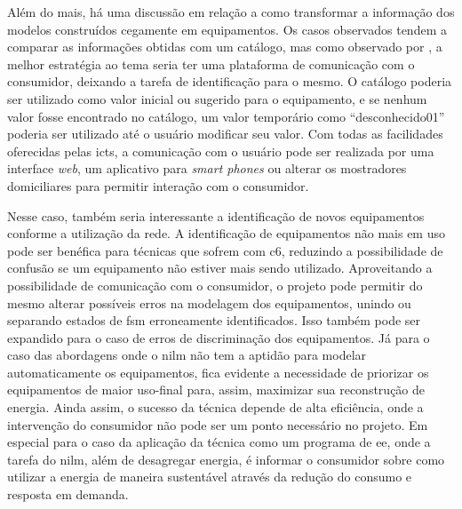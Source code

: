 Além do mais, há uma discussão em relação a como transformar a
informação dos modelos construídos cegamente em equipamentos. Os casos
observados \cite{nilm_hart_1992_8,nilm_bergman_distribuido_2011,
nilm_zeifman_vastext_approach_2012} tendem a comparar as informações
obtidas com um catálogo, mas como observado por
\cite{nilm_matthews_overview_2008_22}, a melhor estratégia ao tema
seria ter uma plataforma de comunicação com o consumidor, deixando a
tarefa de identificação para o mesmo. O catálogo poderia ser utilizado
como valor inicial ou sugerido para o equipamento, e se nenhum valor
fosse encontrado no catálogo, um valor temporário como
``desconhecido01'' poderia ser utilizado até o usuário modificar seu
valor. Com todas as facilidades oferecidas pelas \glspl{ict}, a
comunicação com o usuário pode ser realizada por uma interface
\emph{web}, um aplicativo para \emph{smart phones} ou alterar os
mostradores domiciliares para permitir interação com o consumidor.

Nesse caso, também seria interessante a identificação de novos
equipamentos conforme a utilização da rede. A identificação de equipamentos
não mais em uso pode ser benéfica para técnicas que sofrem com 
\gls{c6}, reduzindo a possibilidade de confusão se um equipamento não
estiver mais sendo utilizado. Aproveitando a possibilidade de
comunicação com o consumidor, o projeto pode permitir do mesmo
alterar possíveis erros na modelagem dos equipamentos, unindo ou
separando estados de \gls{fsm} erroneamente identificados. Isso também
pode ser expandido para o caso de erros de discriminação dos
equipamentos. Já para o caso das abordagens onde o \gls{nilm} não tem a
aptidão para modelar automaticamente os equipamentos, fica evidente a
necessidade de priorizar os equipamentos de maior uso-final para, assim,
maximizar sua reconstrução de energia. Ainda assim, o sucesso da
técnica depende de alta eficiência, onde a intervenção do consumidor
não pode ser um ponto necessário no projeto. Em especial para o caso
da aplicação da técnica como um programa de \gls{ee}, onde a tarefa do
\gls{nilm}, além de desagregar energia, é informar o consumidor sobre
como utilizar a energia de maneira sustentável através da redução do
consumo e resposta em demanda.


